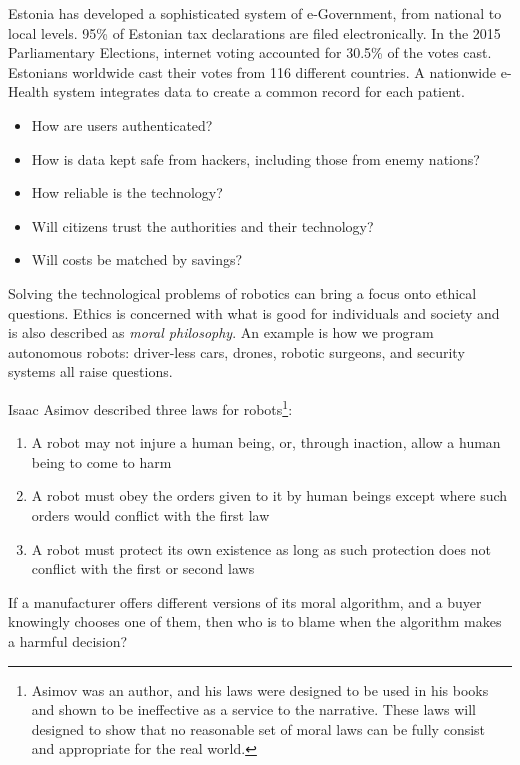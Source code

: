 \documentclass[../main.tex]{subfile}
\begin{document}
Estonia has developed a sophisticated system of e-Government, from national to local levels. 95\% of Estonian tax declarations are filed electronically. In the 2015 Parliamentary Elections, internet voting accounted for 30.5\% of the votes cast. Estonians worldwide cast their votes from 116 different countries. A nationwide e-Health system integrates data to create a common record for each patient.
\begin{itemize}
	\item How are users authenticated?
	\item How is data kept safe from hackers, including those from enemy nations?
	\item How reliable is the technology?
	\item Will citizens trust the authorities and their technology?
	\item Will costs be matched by savings?
\end{itemize}


Solving the technological problems of robotics can bring a focus onto ethical questions. Ethics is concerned with what is good for individuals and society and is also described as \textit{moral philosophy}. An example is how we program autonomous robots: driver-less cars, drones, robotic surgeons, and security systems all raise questions.

Isaac Asimov described three laws for robots\footnote{Asimov was an author, and his laws were designed to be used in his books and shown to be ineffective as a service to the narrative. These laws will designed to show that no reasonable set of moral laws can be fully consist and appropriate for the real world.}:
\begin{enumerate}
	\item A robot may not injure a human being, or, through inaction, allow a human being to come to harm
	\item A robot must obey the orders given to it by human beings except where such orders would conflict with the first law
	\item A robot must protect its own existence as long as such protection does not conflict with the first or second laws
\end{enumerate}


If a manufacturer offers different versions of its moral algorithm, and a buyer knowingly chooses one of them, then who is to blame when the algorithm makes a harmful decision?
\end{document}
